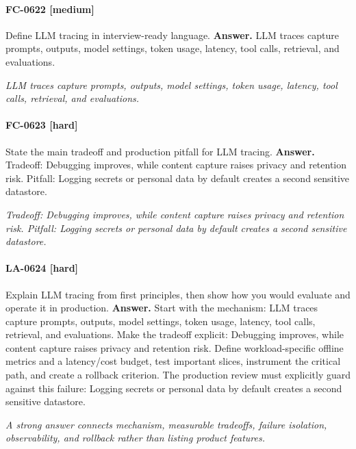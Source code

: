 \paragraph{FC-0622 [medium]} Define LLM tracing in interview-ready language.
\noindent\textbf{Answer.} LLM traces capture prompts, outputs, model settings, token usage, latency, tool calls, retrieval, and evaluations.
\par\textit{LLM traces capture prompts, outputs, model settings, token usage, latency, tool calls, retrieval, and evaluations.}
\paragraph{FC-0623 [hard]} State the main tradeoff and production pitfall for LLM tracing.
\noindent\textbf{Answer.} Tradeoff: Debugging improves, while content capture raises privacy and retention risk. Pitfall: Logging secrets or personal data by default creates a second sensitive datastore.
\par\textit{Tradeoff: Debugging improves, while content capture raises privacy and retention risk. Pitfall: Logging secrets or personal data by default creates a second sensitive datastore.}
\paragraph{LA-0624 [hard]} Explain LLM tracing from first principles, then show how you would evaluate and operate it in production.
\noindent\textbf{Answer.} Start with the mechanism: LLM traces capture prompts, outputs, model settings, token usage, latency, tool calls, retrieval, and evaluations. Make the tradeoff explicit: Debugging improves, while content capture raises privacy and retention risk. Define workload-specific offline metrics and a latency/cost budget, test important slices, instrument the critical path, and create a rollback criterion. The production review must explicitly guard against this failure: Logging secrets or personal data by default creates a second sensitive datastore.
\par\textit{A strong answer connects mechanism, measurable tradeoffs, failure isolation, observability, and rollback rather than listing product features.}
